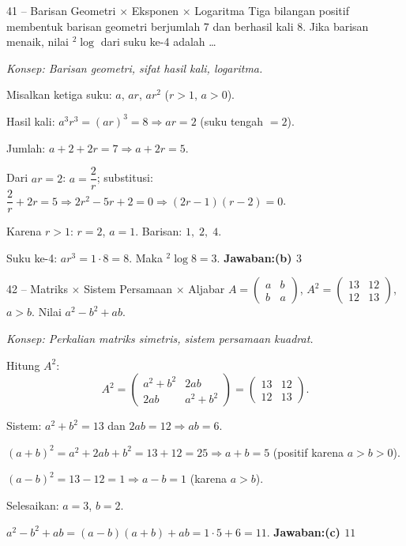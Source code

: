 \documentclass[11pt]{article}
\newcommand{\jawaban}[1]{\textbf{Jawaban:}\enspace\colorbox{gold!30}{\textbf{#1}}}
\newcommand{\konsep}[1]{\textit{Konsep: #1.}}
\begin{document}
\begin{soal}{41 -- Barisan Geometri $\times$ Eksponen $\times$ Logaritma}
Tiga bilangan positif membentuk barisan geometri berjumlah 7 dan berhasil kali 8.
Jika barisan menaik, nilai ${}^2\!\log$ dari suku ke-4 adalah \ldots
\end{soal}
\begin{pembox}
\konsep{Barisan geometri, sifat hasil kali, logaritma}

Misalkan ketiga suku: $a$, $ar$, $ar^2$ ($r>1$, $a>0$).

Hasil kali: $a^3r^3=(ar)^3=8\Rightarrow ar=2$ (suku tengah $= 2$).

Jumlah: $a+2+2r=7\Rightarrow a+2r=5$.

Dari $ar=2$: $a=\dfrac{2}{r}$; substitusi: $\dfrac{2}{r}+2r=5\Rightarrow2r^2-5r+2=0\Rightarrow(2r-1)(r-2)=0$.

Karena $r>1$: $r=2$, $a=1$. Barisan: $1,\;2,\;4$.

Suku ke-4: $ar^3=1\cdot8=8$. Maka ${}^2\!\log 8=3$.
\jawaban{(b) $3$}
\end{pembox}

\begin{soal}{42 -- Matriks $\times$ Sistem Persamaan $\times$ Aljabar}
$A=\begin{pmatrix}a&b\\b&a\end{pmatrix}$, $A^2=\begin{pmatrix}13&12\\12&13\end{pmatrix}$, $a>b$.
Nilai $a^2-b^2+ab$.
\end{soal}
\begin{pembox}
\konsep{Perkalian matriks simetris, sistem persamaan kuadrat}

Hitung $A^2$:
\[
A^2=\begin{pmatrix}a^2+b^2&2ab\\2ab&a^2+b^2\end{pmatrix}=\begin{pmatrix}13&12\\12&13\end{pmatrix}.
\]

Sistem: $a^2+b^2=13$ dan $2ab=12\Rightarrow ab=6$.

$(a+b)^2=a^2+2ab+b^2=13+12=25\Rightarrow a+b=5$ (positif karena $a>b>0$).

$(a-b)^2=13-12=1\Rightarrow a-b=1$ (karena $a>b$).

Selesaikan: $a=3$, $b=2$.

$a^2-b^2+ab=(a-b)(a+b)+ab=1\cdot5+6=11$.
\jawaban{(c) $11$}
\end{pembox}
\end{document}
